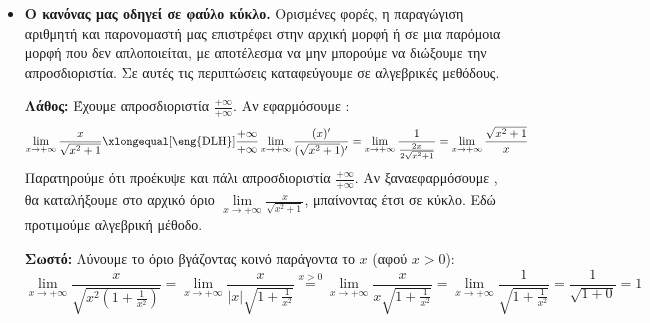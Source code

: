 \begin{itemize}[label=\textcolor{red!80!black}{\faExclamationTriangle},itemindent=7mm,leftmargin=0mm]
\lysh
\textbf{Λάθος:} 
Ελέγχουμε τα όρια. Είναι $\lim\limits_{x\to +\infty}(x+\hm x) = +\infty$ (με παρεμβολή) και $\lim\limits_{x\to +\infty}x = +\infty$.
Έχουμε μορφή $\frac{+\infty}{+\infty}$. Εφαρμόζουμε :
\[ \lim_{x\to +\infty}\frac{x+\hm x}{x} \xlongequal[\text{\eng{DLH}}]{\frac{+\infty}{+\infty}} \lim_{x\to +\infty}\frac{(x+\hm x)'}{(x)'} = \lim_{x\to +\infty}\frac{1+\syn x}{1} = \lim_{x\to +\infty}(1+\syn x) \]
Το τελευταίο όριο \textbf{δεν υπάρχει}. Πολλοί μαθητές σταματούν εδώ και βγάζουν το λανθασμένο συμπέρασμα ότι δεν υπάρχει ούτε το αρχικό όριο. Όμως, αφού το όριο των παραγώγων δεν υπάρχει, απλά \textbf{ο κανόνας του  δεν μπορεί να δώσει απάντηση}.

\textbf{Σωστό:} 
Σπάμε το κλάσμα χωρίς παραγώγιση:
\[ \lim_{x\to +\infty}\frac{x+\hm x}{x} = \lim_{x\to +\infty}\left(\frac{x}{x} + \frac{\hm x}{x}\right) = \lim_{x\to +\infty}\left(1 + \frac{\hm x}{x}\right) \]
Γνωρίζουμε ότι $\lim\limits_{x\to +\infty}\frac{\hm x}{x} = 0$ (αποδεικνύεται με Κριτήριο Παρεμβολής αφού $\left|\frac{\hm x}{x}\right| \le \frac{1}{|x|}$).
Άρα, το ζητούμενο όριο τελικά υπάρχει και ισούται με $1 + 0 = 1$.
\item \textbf{Ο κανόνας  μας οδηγεί σε φαύλο κύκλο.}
Ορισμένες φορές, η παραγώγιση αριθμητή και παρονομαστή μας επιστρέφει στην αρχική μορφή ή σε μια παρόμοια μορφή που δεν απλοποιείται, με αποτέλεσμα να μην μπορούμε να διώξουμε την απροσδιοριστία. Σε αυτές τις περιπτώσεις καταφεύγουμε σε αλγεβρικές μεθόδους.


\lysh
\textbf{Λάθος:} 
Έχουμε απροσδιοριστία $\frac{+\infty}{+\infty}$. Αν εφαρμόσουμε :
\[ \lim_{x\to +\infty}\frac{x}{\sqrt{x^2+1}} \xlongequal[\text{\eng{DLH}}]{\frac{+\infty}{+\infty}} \lim_{x\to +\infty}\frac{(x)'}{(\sqrt{x^2+1})'} = \lim_{x\to +\infty}\frac{1}{\frac{2x}{2\sqrt{x^2+1}}} = \lim_{x\to +\infty}\frac{\sqrt{x^2+1}}{x} \]
Παρατηρούμε ότι προέκυψε και πάλι απροσδιοριστία $\frac{+\infty}{+\infty}$. Αν ξαναεφαρμόσουμε , θα καταλήξουμε στο αρχικό όριο $\lim\limits_{x\to +\infty}\frac{x}{\sqrt{x^2+1}}$, μπαίνοντας έτσι σε κύκλο. Εδώ προτιμούμε αλγεβρική μέθοδο.

\textbf{Σωστό:}
Λύνουμε το όριο βγάζοντας κοινό παράγοντα το $x$ (αφού $x>0$):
\[ \lim_{x\to +\infty}\frac{x}{\sqrt{x^2\left(1+\frac{1}{x^2}\right)}} = \lim_{x\to +\infty}\frac{x}{|x|\sqrt{1+\frac{1}{x^2}}} \stackrel{x>0}{=} \lim_{x\to +\infty}\frac{x}{x\sqrt{1+\frac{1}{x^2}}} = \lim_{x\to +\infty}\frac{1}{\sqrt{1+\frac{1}{x^2}}} = \frac{1}{\sqrt{1+0}} = 1 \]


\end{itemize}

